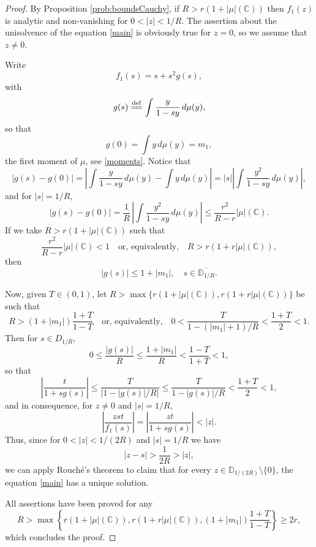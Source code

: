 \documentclass[reqno,11pt]{amsart}
\theoremstyle{plain}
\theoremstyle{definition}
\theoremstyle{remark}
\numberwithin{equation}{section}
\numberwithin{equation}{section}
\newcommand{\C}{\mathbb{C}}
\newcommand{\D}{\mathbb{D}}
\newcommand{\isdef}{\overset{\mathrm{def}}{=\joinrel=}}
\begin{document}
\begin{proof}
By Proposition \ref{prob:boundsCauchy}, if $R>r (1+|\mu|(\C))$ then $f_1(z)$ is analytic and non-vanishing for $0<|z|<1/R$. The assertion about the unisolvence of the equation \eqref{main} is obviously true for $z=0$, so we assume that $z\neq 0$.

Write
\begin{equation}
    \label{f-g}
    f_1 (s)=s + s^2 g (s),
\end{equation}
with
\begin{equation}
    \label{defFG}
    g (s) \isdef \int \frac{y}{1-s y}\, d\mu(y),
\end{equation}
so that 
$$
g (0) = \int y \, d\mu(y) = m_1,
$$
the first moment of $\mu$, see \eqref{moments}. 
Notice that  
	$$
	|g (s)-g (0)| = \left|  \int \frac{y}{1-s y}\, d\mu(y) - \int y \, d\mu(y)\right|  =|s| \left|  \int \frac{y^2}{1-s y}\, d\mu(y) \right| ,
	$$
	and for $|s|=1/R$,
	$$
	|g (s)-g (0)| = \frac{1}{R}\,  \left|  \int \frac{y^2}{1-s y}\, d\mu(y) \right| \le \frac{r^2}{R- r} |\mu|(\C).
	$$
	If we take $R>r (1+|\mu|(\C))$ such that
	$$
	\frac{r^2}{R- r} |\mu|(\C)<1 \quad \text{or, equivalently,} \quad    R>r (1+r|\mu|(\C)),
	$$
	then
	\begin{equation} \label{a1}
		|g (s)|\le 1+|m_1|, \quad s\in \overline{\D_{1/R}}.
	\end{equation}
	
	Now, given $T\in (0,1)$, let $ R>\max\{ r (1+|\mu|(\C)), r (1+r|\mu|(\C))\}$ be such that 
	$$
	R>\left(1+|m_1| \right)\frac{1+T}{1-T} \quad \text{or, equivalently,} \quad  0<\frac{T}{1- ( |m_1|+1)/R}<\frac{1+T}{2}<1.
	$$
	Then for $s\in D_{1/R}$,
	$$
	0\le \frac{|g(s)|}{R } \le \frac{1+|m_1|}{R }<\frac{1-T}{1+T}<1,
	$$
	so that
	\begin{equation} \label{eq:bound1}
			\left| \frac{t}{1+ sg (s)}\right| \le \frac{T}{|1- |g (s)|/R |} \le \frac{T}{1- |g (s)|/R } < \frac{1+T}{2}<1,
	\end{equation}
 and in consequence, for $z\neq 0$ and $|s|=1/R$,
 	\begin{equation}
    \label{boundsErrorProp1}
   \left|   \frac{z st}{f_1 (s)}\right| =   \left|   \frac{z t}{1+ sg (s)}\right| < |z|.
	\end{equation}
  Thus, since for $0<|z|<1/(2R)$ and $|s|=1/R$ we have 
  $$
  |z-s|>\frac{1}{2R}>|z|,
  $$
  we can apply Rouch\'e's theorem to claim that for every $z\in \D_{1/(2R)}\setminus \{0\}$, the equation \eqref{main} has a unique solution. 
  
All assertions have been proved for any
	$$
	R >   \max \left\{    r (1+|\mu| (\C)),  r (1+r|\mu|(\C)), \left(1+|m_1| \right)\frac{1+T}{1-T}  \right\}\ge 2r,
	$$
which concludes the proof. 
\end{proof}
\end{document}
